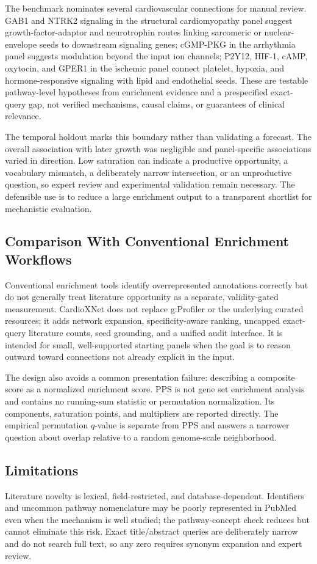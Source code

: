 \documentclass{ieeeaccess}
\begin{document}
The benchmark nominates several cardiovascular connections for manual review. GAB1 and NTRK2 signaling in the structural cardiomyopathy panel suggest growth-factor-adaptor and neurotrophin routes linking sarcomeric or nuclear-envelope seeds to downstream signaling genes; cGMP-PKG in the arrhythmia panel suggests modulation beyond the input ion channels; P2Y12, HIF-1, cAMP, oxytocin, and GPER1 in the ischemic panel connect platelet, hypoxia, and hormone-responsive signaling with lipid and endothelial seeds. These are testable pathway-level hypotheses from enrichment evidence and a prespecified exact-query gap, not verified mechanisms, causal claims, or guarantees of clinical relevance.

The temporal holdout marks this boundary rather than validating a forecast. The overall association with later growth was negligible and panel-specific associations varied in direction. Low saturation can indicate a productive opportunity, a vocabulary mismatch, a deliberately narrow intersection, or an unproductive question, so expert review and experimental validation remain necessary. The defensible use is to reduce a large enrichment output to a transparent shortlist for mechanistic evaluation.

\subsection{Comparison With Conventional Enrichment Workflows}
Conventional enrichment tools identify overrepresented annotations correctly but do not generally treat literature opportunity as a separate, validity-gated measurement. CardioXNet does not replace g:Profiler or the underlying curated resources; it adds network expansion, specificity-aware ranking, uncapped exact-query literature counts, seed grounding, and a unified audit interface. It is intended for small, well-supported starting panels when the goal is to reason outward toward connections not already explicit in the input.

The design also avoids a common presentation failure: describing a composite score as a normalized enrichment score. PPS is not gene set enrichment analysis and contains no running-sum statistic or permutation normalization. Its components, saturation points, and multipliers are reported directly. The empirical permutation $q$-value is separate from PPS and answers a narrower question about overlap relative to a random genome-scale neighborhood.

\subsection{Limitations}
Literature novelty is lexical, field-restricted, and database-dependent. Identifiers and uncommon pathway nomenclature may be poorly represented in PubMed even when the mechanism is well studied; the pathway-concept check reduces but cannot eliminate this risk. Exact title/abstract queries are deliberately narrow and do not search full text, so any zero requires synonym expansion and expert review.
\end{document}

